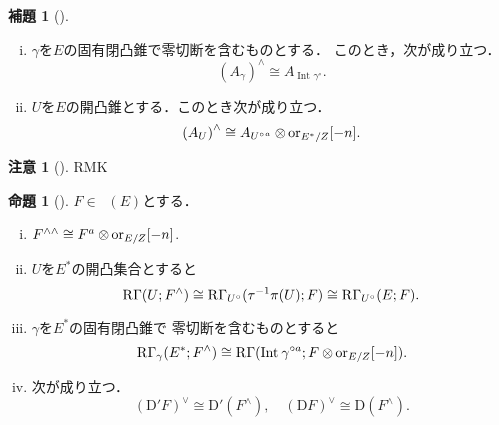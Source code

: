 \documentclass[uplatex,dvipdfmx,a4paper,10pt,draft]{jsarticle}
\theoremstyle{definition}
\newcommand{\rr}{\mathbf{R}}
\numberwithin{equation}{section}
\newcommand{\RG}{\mathop{\mathrm{R}\hspace{-0pt}\Gamma}\nolimits}
\newcommand{\rmD}{\mathrm{D}}
\newcommand{\ori}{\mathord{\mathrm{or}}}
\newcommand{\tens}[1][]{\mathbin{\otimes_{\raise1.5ex\hbox to-.1em{}{#1}}}}
\theoremstyle{mystyle}
\newtheorem{RMK}[AXM]{注意}
\newtheorem{mylmm}[mythm]{補題}
\newtheorem{myprp}[mythm]{命題}
\newenvironment{lmm}{\begin{lmmbox}\begin{mylmm}}{\end{mylmm}\end{lmmbox}}
\newenvironment{prp}{\begin{prpbox}\begin{myprp}}{\end{myprp}\end{prpbox}}
\newcommand{\Dlcon}{\mathop{\mathsf{D}^{+}_{\rr_{>0}}}\nolimits}
\newcommand{\Int}[1][]{\mathop{\mathrm{Int}}\nolimits_{#1}}
\begin{document}
\begin{lmm}[{\cite[Lemma 3.7.10]{KS90}}]
    \begin{enumerate}[(i)]
        \item \(\gamma\)を\(E\)の固有閉凸錐で零切断を含むものとする．
        このとき，次が成り立つ．\[
            \left(A_\gamma\right)^\wedge
            \cong A_{\Int{\gamma^\circ}}.
        \]
        \item \(U\)を\(E\)の開凸錐とする．このとき次が成り立つ．
        \[
            \left(A_U\right)^\wedge\cong
            A_{{U^{\circ}}^a}\tens \ori_{E^\ast/Z}[-n].
        \]
    \end{enumerate}
\end{lmm}
\begin{RMK}[{\cite[Remark 3.7.11]{KS90}}]
    RMK
\end{RMK}
\begin{prp}[{\cite[Proposition 3.7.12]{KS90}}]
    \(F\in\Dlcon(E)\)とする．
    \begin{enumerate}[(i)]
        \item \(F^{\wedge\wedge}\cong F^a\tens \ori_{E/Z}[-n]\).
        \item \(U\)を\(E^\ast\)の開凸集合とすると\[
            \RG(U;F^\wedge)
            \cong\RG_{U^\circ}(\tau^{-1}\pi(U);F)
            \cong\RG_{U^\circ}(E;F).
        \]
        \item \(\gamma\)を\(E^\ast\)の固有閉凸錐で
        零切断を含むものとすると\[
            \RG_{\gamma}(E^\ast;F^\wedge)
            \cong
            \RG(\Int{\gamma^{\circ a}};F\tens\ori_{E/Z}[-n]).
        \]
        \item 次が成り立つ．\[
            \left(\rmD'F\right)^\vee\cong\rmD'(F^\wedge),
            \quad
            \left(\rmD F\right)^\vee\cong\rmD(F^\wedge).
            \]
    \end{enumerate}
\end{prp}
\end{document}

